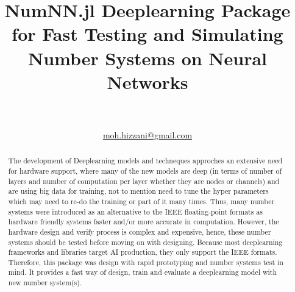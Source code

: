 \documentclass[onecolumn,draftcls,12pt]{IEEEtran}
\title{NumNN.jl Deeplearning Package for Fast Testing and Simulating Number Systems on Neural Networks}
\author{\IEEEauthorblockN{Mohammad~Hizzani} \\ \IEEEauthorblockA{University of Lisbon}\\
\href{mailto:moh.hizzani@gmail.com}{moh.hizzani@gmail.com}}
\begin{document}
	\maketitle

	\begin{abstract}
		The development of Deeplearning models and techneques approches an extensive need for hardware support, where many of the new models are deep (in terms of number of layers and number of computation per layer whether they are nodes or channels) and are using big data for training, not to mention need to tune the hyper parameters which may need to re-do the training or part of it many times. Thus, many number systems were introduced as an alternative to the IEEE floating-point formats as hardware friendly systems faster and/or more accurate in computation. However, the hardware design and verify process is complex and expensive, hence, these number systems should be tested before moving on with designing. Because most deeplearning frameworks and libraries target AI production, they only support the IEEE formats. Therefore, this package was design with rapid prototyping and number systems test in mind. It provides a fast way of design, train and evaluate a deeplearning model with new number system(s).
	\end{abstract}
\end{document}

